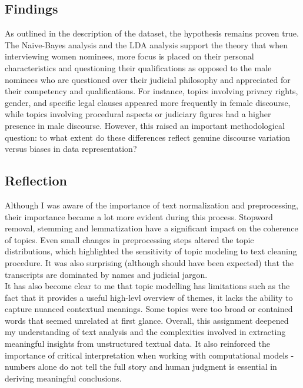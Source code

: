 \documentclass[titlepage]{article}
\begin{document}
\subsection{Findings}
As outlined in the description of the dataset, the hypothesis remains proven true. The Naive-Bayes analysis and the LDA analysis support the theory 
that when interviewing women nominees, more focus is placed on their personal characteristics and questioning their qualifications as opposed to the male 
nominees who are questioned over their judicial philosophy and appreciated for their competency and qualifications.  For instance, topics involving privacy 
rights, gender, and specific legal clauses appeared more frequently in female discourse, while topics involving procedural aspects or judiciary figures had 
a higher presence in male discourse. However, this raised an important methodological question: to what extent do these differences reflect genuine discourse 
variation versus biases in data representation?

\subsection{Reflection}
Although I was aware of the importance of text normalization and preprocessing, their importance became a lot more evident during this process. Stopword removal, 
stemming and lemmatization have a significant impact on the coherence of topics. Even small changes in preprocessing steps altered the topic distributions, 
which highlighted the sensitivity of topic modeling to text cleaning procedure. It was also surprising (although should have been expected) that the transcripts are 
dominated by names and judicial jargon. \\

It has also become clear to me that topic modelling has limitations such as the fact that it provides a useful high-levl overview of themes, it lacks the ability to 
capture nuanced contextual meanings. Some topics were too broad or contained words that seemed unrelated at first glance. Overall, this assignment deepened my understanding 
of text analysis and the complexities involved in extracting meaningful insights from unstructured textual data. It also reinforced the importance of critical interpretation 
when working with computational models - numbers alone do not tell the full story and human judgment is essential in deriving meaningful conclusions.
\end{document}
